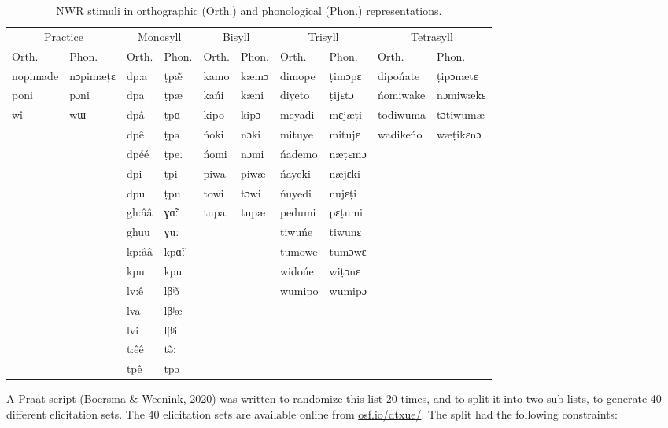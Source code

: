 \documentclass[
  american,
  ,man,floatsintext]{apa6}
\begin{document}
\begin{table}

\caption{\label{tab:tabstims}NWR stimuli in orthographic (Orth.) and phonological (Phon.) representations.}
\centering
\begin{tabular}[t]{llllllllll}
\toprule
\multicolumn{2}{c}{Practice} & \multicolumn{2}{c}{Monosyll} & \multicolumn{2}{c}{Bisyll} & \multicolumn{2}{c}{Trisyll} & \multicolumn{2}{c}{Tetrasyll} \\
\cmidrule(l{3pt}r{3pt}){1-2} \cmidrule(l{3pt}r{3pt}){3-4} \cmidrule(l{3pt}r{3pt}){5-6} \cmidrule(l{3pt}r{3pt}){7-8} \cmidrule(l{3pt}r{3pt}){9-10}
Orth. & Phon. & Orth. & Phon. & Orth. & Phon. & Orth. & Phon. & Orth. & Phon.\\
\midrule
nopimade & nɔpimæṭɛ & dp:a & ṭpæ̃ & kamo & kæmɔ & dimope & ṭimɔpɛ & dipońate & ṭipɔnætɛ\\
poni & pɔni & dpa & ṭpæ & kańi & kæni & diyeto & ṭijɛtɔ & ńomiwake & nɔmiwækɛ\\
wî & wɯ & dpâ & ṭpɑ & kipo & kipɔ & meyadi & mɛjæṭi & todiwuma & tɔṭiwumæ\\
 &  & dpê & ṭpə & ńoki & nɔki & mituye & mitujɛ & wadikeńo & wæṭikɛnɔ\\
 &  & dpéé & ṭpeː & ńomi & nɔmi & ńademo & næṭɛmɔ &  & \\
\addlinespace
 &  & dpi & ṭpi & piwa & piwæ & ńayeki & næjɛki &  & \\
 &  & dpu & ṭpu & towi & tɔwi & ńuyedi & nujɛṭi &  & \\
 &  & gh:ââ & ɣɑ̃ː & tupa & tupæ & pedumi & pɛṭumi &  & \\
 &  & ghuu & ɣuː &  &  & tiwuńe & tiwunɛ &  & \\
 &  & kp:ââ & kpɑ̃ː &  &  & tumowe & tumɔwɛ &  & \\
\addlinespace
 &  & kpu & kpu &  &  & widońe & wiṭɔnɛ &  & \\
 &  & lv:ê & lβʲə̃ &  &  & wumipo & wumipɔ &  & \\
 &  & lva & lβʲæ &  &  &  &  &  & \\
 &  & lvi & lβʲi &  &  &  &  &  & \\
 &  & t:êê & tə̃ː &  &  &  &  &  & \\
\addlinespace
 &  & tpê & tpə &  &  &  &  &  & \\
\bottomrule
\end{tabular}
\end{table}

A Praat script (Boersma \& Weenink, 2020) was written to randomize this list 20 times, and to split it into two sub-lists, to generate 40 different elicitation sets. The 40 elicitation sets are available online from \href{https://osf.io/dtxue/}{osf.io/dtxue/}. The split had the following constraints:
\end{document}
